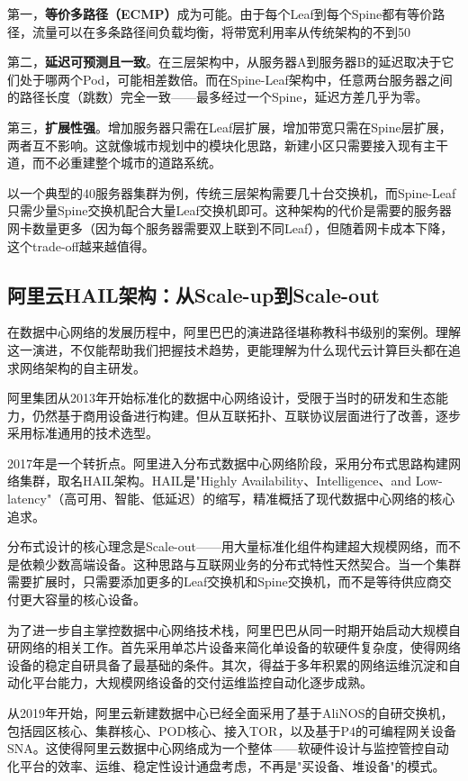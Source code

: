 第一，\textbf{等价多路径（ECMP）}成为可能。由于每个Leaf到每个Spine都有等价路径，流量可以在多条路径间负载均衡，将带宽利用率从传统架构的不到50%

第二，\textbf{延迟可预测且一致}。在三层架构中，从服务器A到服务器B的延迟取决于它们处于哪两个Pod，可能相差数倍。而在Spine-Leaf架构中，任意两台服务器之间的路径长度（跳数）完全一致——最多经过一个Spine，延迟方差几乎为零。

第三，\textbf{扩展性强}。增加服务器只需在Leaf层扩展，增加带宽只需在Spine层扩展，两者互不影响。这就像城市规划中的模块化思路，新建小区只需要接入现有主干道，而不必重建整个城市的道路系统。

以一个典型的40服务器集群为例，传统三层架构需要几十台交换机，而Spine-Leaf只需少量Spine交换机配合大量Leaf交换机即可。这种架构的代价是需要的服务器网卡数量更多（因为每个服务器需要双上联到不同Leaf），但随着网卡成本下降，这个trade-off越来越值得。

\subsection{阿里云HAIL架构：从Scale-up到Scale-out}

在数据中心网络的发展历程中，阿里巴巴的演进路径堪称教科书级别的案例。理解这一演进，不仅能帮助我们把握技术趋势，更能理解为什么现代云计算巨头都在追求网络架构的自主研发。

阿里集团从2013年开始标准化的数据中心网络设计，受限于当时的研发和生态能力，仍然基于商用设备进行构建。但从互联拓扑、互联协议层面进行了改善，逐步采用标准通用的技术选型。

2017年是一个转折点。阿里进入分布式数据中心网络阶段，采用分布式思路构建网络集群，取名HAIL架构。HAIL是"Highly Availability、Intelligence、and Low-latency"（高可用、智能、低延迟）的缩写，精准概括了现代数据中心网络的核心追求。

分布式设计的核心理念是Scale-out——用大量标准化组件构建超大规模网络，而不是依赖少数高端设备。这种思路与互联网业务的分布式特性天然契合。当一个集群需要扩展时，只需要添加更多的Leaf交换机和Spine交换机，而不是等待供应商交付更大容量的核心设备。

为了进一步自主掌控数据中心网络技术栈，阿里巴巴从同一时期开始启动大规模自研网络的相关工作。首先采用单芯片设备来简化单设备的软硬件复杂度，使得网络设备的稳定自研具备了最基础的条件。其次，得益于多年积累的网络运维沉淀和自动化平台能力，大规模网络设备的交付运维监控自动化逐步成熟。

从2019年开始，阿里云新建数据中心已经全面采用了基于AliNOS的自研交换机，包括园区核心、集群核心、POD核心、接入TOR，以及基于P4的可编程网关设备SNA。这使得阿里云数据中心网络成为一个整体——软硬件设计与监控管控自动化平台的效率、运维、稳定性设计通盘考虑，不再是"买设备、堆设备"的模式。

